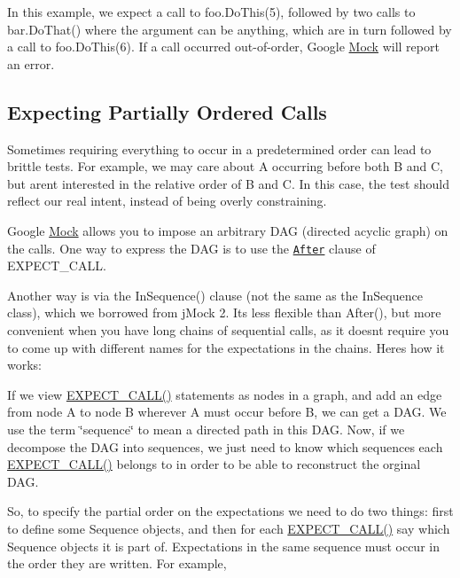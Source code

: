 In this example, we expect a call to {\ttfamily foo.\+Do\+This(5)}, followed by two calls to {\ttfamily bar.\+Do\+That()} where the argument can be anything, which are in turn followed by a call to {\ttfamily foo.\+Do\+This(6)}. If a call occurred out-\/of-\/order, Google \hyperlink{class_mock}{Mock} will report an error.

\subsection*{Expecting Partially Ordered Calls}

Sometimes requiring everything to occur in a predetermined order can lead to brittle tests. For example, we may care about {\ttfamily A} occurring before both {\ttfamily B} and {\ttfamily C}, but aren\textquotesingle{}t interested in the relative order of {\ttfamily B} and {\ttfamily C}. In this case, the test should reflect our real intent, instead of being overly constraining.

Google \hyperlink{class_mock}{Mock} allows you to impose an arbitrary D\+AG (directed acyclic graph) on the calls. One way to express the D\+AG is to use the \href{http://code.google.com/p/googlemock/wiki/V1_7_CheatSheet#The_After_Clause}{\tt After} clause of {\ttfamily E\+X\+P\+E\+C\+T\+\_\+\+C\+A\+LL}.

Another way is via the {\ttfamily In\+Sequence()} clause (not the same as the {\ttfamily In\+Sequence} class), which we borrowed from j\+Mock 2. It\textquotesingle{}s less flexible than {\ttfamily After()}, but more convenient when you have long chains of sequential calls, as it doesn\textquotesingle{}t require you to come up with different names for the expectations in the chains. Here\textquotesingle{}s how it works\+:

If we view {\ttfamily \hyperlink{gmock-spec-builders_8h_a535a6156de72c1a2e25a127e38ee5232}{E\+X\+P\+E\+C\+T\+\_\+\+C\+A\+L\+L()}} statements as nodes in a graph, and add an edge from node A to node B wherever A must occur before B, we can get a D\+AG. We use the term \char`\"{}sequence\char`\"{} to mean a directed path in this D\+AG. Now, if we decompose the D\+AG into sequences, we just need to know which sequences each {\ttfamily \hyperlink{gmock-spec-builders_8h_a535a6156de72c1a2e25a127e38ee5232}{E\+X\+P\+E\+C\+T\+\_\+\+C\+A\+L\+L()}} belongs to in order to be able to reconstruct the orginal D\+AG.

So, to specify the partial order on the expectations we need to do two things\+: first to define some {\ttfamily Sequence} objects, and then for each {\ttfamily \hyperlink{gmock-spec-builders_8h_a535a6156de72c1a2e25a127e38ee5232}{E\+X\+P\+E\+C\+T\+\_\+\+C\+A\+L\+L()}} say which {\ttfamily Sequence} objects it is part of. Expectations in the same sequence must occur in the order they are written. For example,


